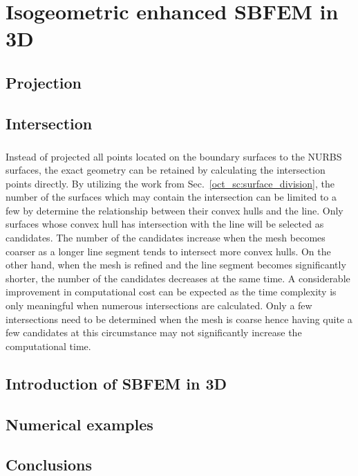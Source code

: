 
\chapter{Isogeometric enhanced SBFEM in 3D}


\section{Projection}




\section{Intersection}
\paragraph{}
Instead of projected all points located on the boundary surfaces to the NURBS surfaces, the exact geometry can be retained by calculating the intersection points directly.
By utilizing the work from Sec.~\ref{oct_sc:surface_division}, the number of the surfaces which may contain the intersection can be limited to a few by determine the relationship between their convex hulls and the line.
Only surfaces whose convex hull has intersection with the line will be selected as candidates.
The number of the candidates increase when the mesh becomes coarser as a longer line segment tends to intersect more convex hulls.
On the other hand, when the mesh is refined and the line segment becomes significantly shorter, the number of the candidates decreases at the same time.
A considerable improvement in computational cost can be expected as the time complexity is only meaningful when numerous intersections are calculated.
Only a few intersections need to be determined when the mesh is coarse hence having quite a few candidates at this circumstance may not significantly increase the computational time.




\section{Introduction of SBFEM in 3D}


\section{Numerical examples}





\section{Conclusions}